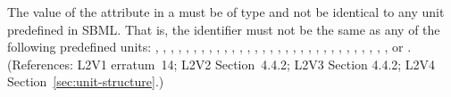 The value of the  attribute in a \UnitDefinition must be of
type  and not be
identical to any unit predefined in SBML.  That is, the identifier
must not be the same as any of the following predefined units:
,
,
,
,
,
,
,
,
,
,
,
,
,
,
,
,
,
,
,
,
,
,
,
,
,
,
,
,
,
,
, or
.
(References: L2V1 erratum~14; L2V2 Section~4.4.2; L2V3 Section 4.4.2;
L2V4 Section~\ref{sec:unit-structure}.)
